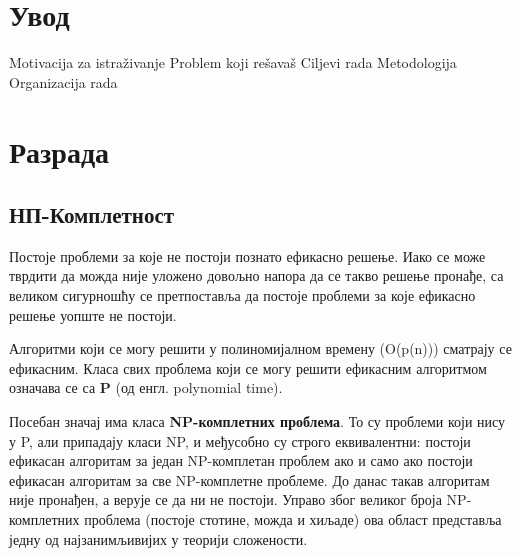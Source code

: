 \documentclass[12pt,oneside]{memoir}
\begin{document}
\frontmatter
\naslovna
\komisija
\posveta{}
\apstrakt
\tableofcontents*

\mainmatter

\chapter{Увод}
Motivacija za istraživanje
Problem koji rešavaš
Ciljevi rada
Metodologija
Organizacija rada


\chapter{Разрада}

\section{НП-Комплетност}

Постоје проблеми за које не постоји познато ефикасно решење. Иако се може тврдити да можда није уложено довољно напора да се такво решење пронађе, са великом сигурношћу се претпоставља да постоје проблеми за које ефикасно решење уопште не постоји.  

Алгоритми који се могу решити у полиномијалном времену (O(p(n))) сматрају се ефикасним. Класа свих проблема који се могу решити ефикасним алгоритмом означава се са \textbf{P} (од енгл. polynomial time).  

Посебан значај има класа \textbf{NP-комплетних проблема}. То су проблеми који нису у P, али припадају класи NP, и међусобно су строго еквивалентни: постоји ефикасан алгоритам за један NP-комплетан проблем ако и само ако постоји ефикасан алгоритам за све NP-комплетне проблеме. До данас такав алгоритам није пронађен, а верује се да ни не постоји. Управо због великог броја NP-комплетних проблема (постоје стотине, можда и хиљаде) ова област представља једну од најзанимљивијих у теорији сложености.  
\end{document}
